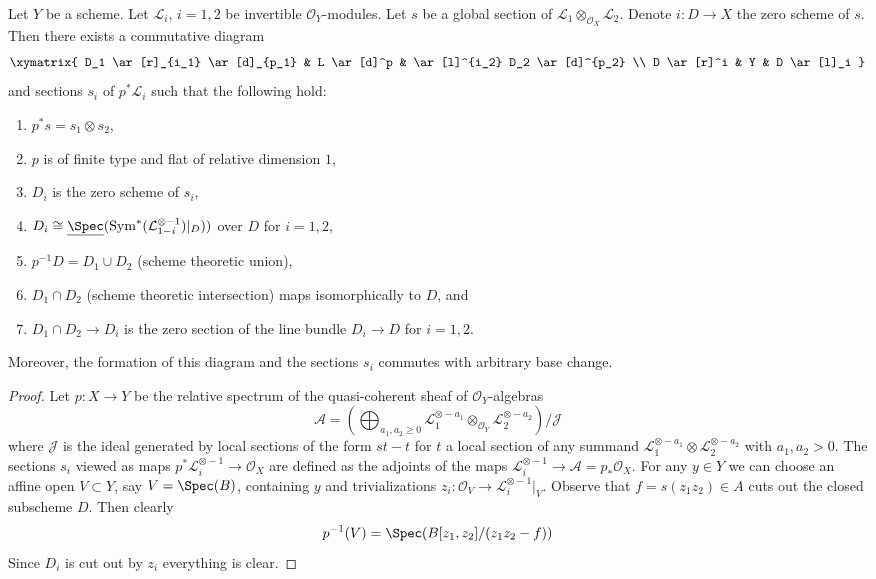 \begin{lemma}
\label{lemma-decompose-section}
Let $Y$ be a scheme. Let $\mathcal{L}_i$, $i = 1, 2$ be invertible
$\mathcal{O}_Y$-modules. Let $s$ be a global section of
$\mathcal{L}_1 \otimes_{\mathcal{O}_X} \mathcal{L}_2$.
Denote $i : D \to X$ the zero scheme of $s$.
Then there exists a commutative diagram
$$
\xymatrix{
D_1 \ar[r]_{i_1} \ar[d]_{p_1} & L \ar[d]^p & \ar[l]^{i_2} D_2 \ar[d]^{p_2} \\
D \ar[r]^i & Y & D \ar[l]_i
}
$$
and sections $s_i$ of $p^*\mathcal{L}_i$ such that
the following hold:
\begin{enumerate}
\item $p^*s = s_1 \otimes s_2$,
\item $p$ is of finite type and flat of relative dimension $1$,
\item $D_i$ is the zero scheme of $s_i$,
\item $D_i \cong
\underline{\Spec}(\text{Sym}^*(\mathcal{L}_{1 - i}^{\otimes -1})|_D))$
over $D$ for $i = 1, 2$,
\item $p^{-1}D = D_1 \cup D_2$ (scheme theoretic union),
\item $D_1 \cap D_2$ (scheme theoretic intersection) maps
isomorphically to $D$, and
\item $D_1 \cap D_2 \to D_i$
is the zero section of the line bundle $D_i \to D$ for $i = 1, 2$.
\end{enumerate}
Moreover, the formation of this diagram and the sections $s_i$
commutes with arbitrary base change.
\end{lemma}

\begin{proof}
Let $p : X \to Y$ be the relative spectrum of the quasi-coherent
sheaf of $\mathcal{O}_Y$-algebras
$$
\mathcal{A} =
\left(\bigoplus\nolimits_{a_1, a_2 \geq 0}
\mathcal{L}_1^{\otimes -a_1} \otimes_{\mathcal{O}_Y}
\mathcal{L}_2^{\otimes -a_2}\right)/\mathcal{J}
$$
where $\mathcal{J}$ is the ideal generated by local sections of
the form $st - t$ for $t$ a local section of any summand
$\mathcal{L}_1^{\otimes -a_1} \otimes \mathcal{L}_2^{\otimes -a_2}$
with $a_1, a_2 > 0$. The sections $s_i$ viewed as maps
$p^*\mathcal{L}_i^{\otimes -1} \to \mathcal{O}_X$ are defined as the adjoints
of the maps $\mathcal{L}_i^{\otimes -1} \to \mathcal{A} = p_*\mathcal{O}_X$.
For any $y \in Y$ we can choose an affine
open $V \subset Y$, say $V = \Spec(B)$, containing $y$ and
trivializations $z_i : \mathcal{O}_V \to \mathcal{L}_i^{\otimes -1}|_V$.
Observe that $f = s(z_1z_2) \in A$ cuts out the closed subscheme $D$.
Then clearly
$$
p^{-1}(V) = \Spec(B[z_1, z_2]/(z_1 z_2 - f))
$$
Since $D_i$ is cut out by $z_i$ everything is clear.
\end{proof}

